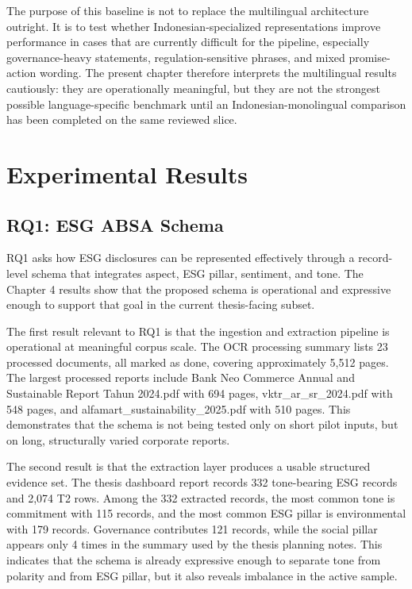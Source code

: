The purpose of this baseline is not to replace the multilingual architecture outright. It is to test whether Indonesian-specialized representations improve performance in cases that are currently difficult for the pipeline, especially governance-heavy statements, regulation-sensitive phrases, and mixed promise-action wording. The present chapter therefore interprets the multilingual results cautiously: they are operationally meaningful, but they are not the strongest possible language-specific benchmark until an Indonesian-monolingual comparison has been completed on the same reviewed slice.

\section{Experimental Results}

\subsection{RQ1: ESG ABSA Schema}

RQ1 asks how ESG disclosures can be represented effectively through a record-level schema that integrates aspect, ESG pillar, sentiment, and tone. The Chapter 4 results show that the proposed schema is operational and expressive enough to support that goal in the current thesis-facing subset.

The first result relevant to RQ1 is that the ingestion and extraction pipeline is operational at meaningful corpus scale. The OCR processing summary lists 23 processed documents, all marked as done, covering approximately 5,512 pages. The largest processed reports include Bank Neo Commerce Annual and Sustainable Report Tahun 2024.pdf with 694 pages, vktr\_ar\_sr\_2024.pdf with 548 pages, and alfamart\_sustainability\_2025.pdf with 510 pages. This demonstrates that the schema is not being tested only on short pilot inputs, but on long, structurally varied corporate reports.

The second result is that the extraction layer produces a usable structured evidence set. The thesis dashboard report records 332 tone-bearing ESG records and 2,074 T2 rows. Among the 332 extracted records, the most common tone is commitment with 115 records, and the most common ESG pillar is environmental with 179 records. Governance contributes 121 records, while the social pillar appears only 4 times in the summary used by the thesis planning notes. This indicates that the schema is already expressive enough to separate tone from polarity and from ESG pillar, but it also reveals imbalance in the active sample.


